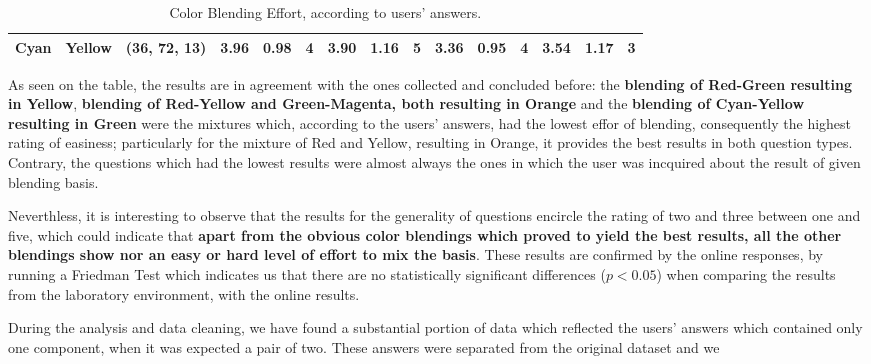 \begin{table}[htbp]
{\begin{tabular}{@{}ccclcccccccccccc@{}}
    Cyan                    & \multicolumn{1}{c|}{Yellow}                    & \multicolumn{2}{c|}{\cellcolor[HTML]{00FF00}(36, 72, 13)}  & \multicolumn{1}{c|}{3.96} & \multicolumn{1}{c|}{0.98}  & \multicolumn{1}{c|}{4}                                  & \multicolumn{1}{c|}{3.90} & \multicolumn{1}{c|}{1.16}  & \multicolumn{1}{c|}{\cellcolor[HTML]{32CB00}\textbf{5}} & \multicolumn{1}{c|}{3.36}                   & \multicolumn{1}{c|}{0.95}                   & \multicolumn{1}{c|}{4}                                  & \multicolumn{1}{c|}{3.54}                   & \multicolumn{1}{c|}{1.17}                   & \multicolumn{1}{c|}{3}                                                    \\ \bottomrule
  \end{tabular}}
  \caption[Color Blending Effort, according to users' answers.]{Color Blending Effort, according to users' answers.}
  \label{table:difficulties_blendings}
\end{table}
%
As seen on the table, the results are in agreement with the ones collected and concluded before: the \textbf{blending of Red-Green resulting in Yellow}, \textbf{blending of Red-Yellow and Green-Magenta, both resulting in Orange} and the
\textbf{blending of Cyan-Yellow resulting in Green} were the mixtures which, according to the users' answers, had the lowest effor of blending, consequently the highest rating of easiness; particularly for the mixture of Red and Yellow, resulting in
Orange, it provides the best results in both question types. Contrary, the questions which had the lowest results were almost always the ones in which the user was incquired about the result of given blending basis. \par
%
Neverthless, it is interesting to observe that the results for the generality of questions encircle the rating of two and three between one and five, which could indicate that \textbf{apart from the obvious color blendings which proved to yield the
best results, all the other blendings show nor an easy or hard level of effort to mix the basis}. These results are confirmed by the online responses, by running a Friedman Test which indicates us that there are no statistically significant differences
($p < 0.05$) when comparing the results from the laboratory environment, with the online results. \par
%
During the analysis and data cleaning, we have found a substantial portion of data which reflected the users' answers which contained only one component, when it was expected a pair of two. These answers were separated from the original dataset and we
